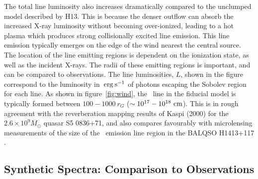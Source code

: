 \documentclass[useAMS,usenatbib]{mn2e_x}
\begin{document}
The total line luminosity also increases dramatically compared to the unclumped model
described by H13. This is because the denser outflow can absorb the increased
X-ray luminosity without becoming over-ionized, leading to a hot plasma which
produces strong collisionally excited line emission.
This line emission typically emerges on the edge of the wind
nearest the central source. The location of the line emitting regions
is dependent on the ionization state, as well as the incident X-rays.
The radii of these emitting regions is important,
and can be compared to observations. The line luminosities, $L$,
shown in the figure correspond to the luminosity in $\:{\rm erg\:s^{-1}}$ of photons
escaping the Sobolev region for each line. 
As shown in figure~\ref{fig:wind},
the \civline\ line in the fiducial model is typically formed between 
$100-1000~r_G$ ($\sim10^{17}-10^{18}~\rm{cm}$).
This is in rough agreement with the reverberation mapping 
results of Kaspi (2000) for the $2.6\times10^{9} M_\odot$ quasar S5 0836+71,
and also compares favourably with microlensing measurements of the size of the
\civline\ emission line region in the BALQSO H1413+117 \citep{odowd2015}.


\subsection{Synthetic Spectra: Comparison to Observations}
\end{document}
